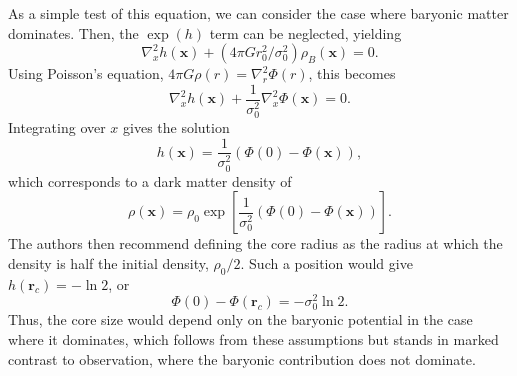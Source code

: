 As a simple test of this equation, we can consider the case where
baryonic matter dominates. Then, the $\exp(h)$ term can be neglected,
yielding
\begin{equation}
\nabla_x^2 h(\mathbf{x}) + (4\pi G r_0^2/\sigma_0^2) \rho_B(\mathbf{x}) = 0.
\end{equation}
Using Poisson's equation, $4\pi G \rho(r) = \nabla_r^2 \Phi(r)$, this becomes 
\begin{equation}
\nabla_x^2 h(\mathbf{x}) + \frac{1}{\sigma_0^2} \nabla_x^2 \Phi(\mathbf{x}) = 0.
\end{equation}
Integrating over $x$ gives the solution 
\begin{equation}
h(\mathbf{x}) = \frac{1}{\sigma_0^2} \left(\Phi(0) - \Phi(\mathbf{x})\right),
\end{equation}
which corresponds to a dark matter density of 
\begin{equation}
\rho(\mathbf{x}) = \rho_0 \exp\left[\frac{1}{\sigma_0^2} 
\left(\Phi(0) - \Phi(\mathbf{x})\right) \right].
\end{equation}
The authors then recommend defining the core radius as the radius at
which the density is half the initial density, \(\rho_0 / 2\). Such a position
would give \(h(\mathbf{r}_c) = -\ln 2\), or
\begin{equation}
\Phi(0) - \Phi(\mathbf{r}_c) = -\sigma_0^2 \ln 2.
\end{equation}
Thus, the core size would depend only on the baryonic potential in the case
where it dominates, which follows from these assumptions but stands in marked
contrast to observation, where the baryonic contribution does not dominate.


